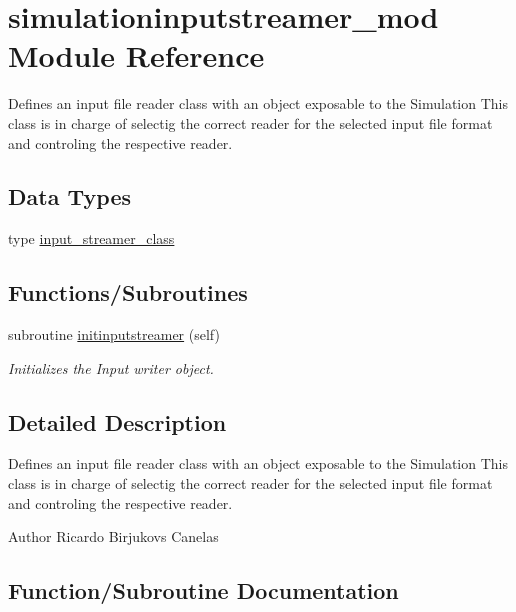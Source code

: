 \hypertarget{namespacesimulationinputstreamer__mod}{}\section{simulationinputstreamer\+\_\+mod Module Reference}
\label{namespacesimulationinputstreamer__mod}


Defines an input file reader class with an object exposable to the Simulation This class is in charge of selectig the correct reader for the selected input file format and controling the respective reader.  


\subsection*{Data Types}
\begin{DoxyCompactItemize}
\item 
type \mbox{\hyperlink{structsimulationinputstreamer__mod_1_1input__streamer__class}{input\+\_\+streamer\+\_\+class}}
\end{DoxyCompactItemize}
\subsection*{Functions/\+Subroutines}
\begin{DoxyCompactItemize}
\item 
subroutine \mbox{\hyperlink{namespacesimulationinputstreamer__mod_a0e5a1e43fe53f179325858d486a284e5}{initinputstreamer}} (self)
\begin{DoxyCompactList}\small\item\em Initializes the Input writer object. \end{DoxyCompactList}\end{DoxyCompactItemize}


\subsection{Detailed Description}
Defines an input file reader class with an object exposable to the Simulation This class is in charge of selectig the correct reader for the selected input file format and controling the respective reader. 

\begin{DoxyAuthor}{Author}
Ricardo Birjukovs Canelas 
\end{DoxyAuthor}


\subsection{Function/\+Subroutine Documentation}
\mbox{\label{namespacesimulationinputstreamer__mod_a0e5a1e43fe53f179325858d486a284e5}} 
